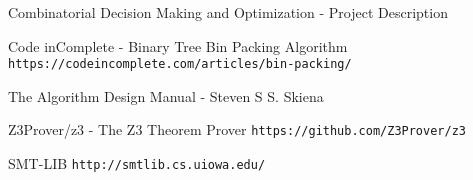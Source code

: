 \begin{thebibliography}{2}
        Combinatorial Decision Making and Optimization - Project Description
    
        Code inComplete - Binary Tree Bin Packing Algorithm
        \texttt{https://codeincomplete.com/articles/bin-packing/}
    
        The Algorithm Design Manual - Steven S S. Skiena 
 
 		Z3Prover/z3 - The Z3 Theorem Prover
 		\texttt{https://github.com/Z3Prover/z3}
        
   		SMT-LIB
    	\texttt{http://smtlib.cs.uiowa.edu/}
\end{thebibliography}